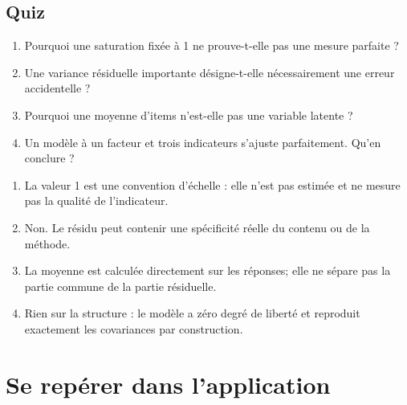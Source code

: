 \documentclass[
  french,
  11pt,
  a4paper,
  DIV=11,
  numbers=noendperiod]{scrreprt}
\providecommand{\tightlist}{%
  \setlength{\itemsep}{0pt}\setlength{\parskip}{0pt}}
\begin{document}
\section{Quiz}\label{quiz}

\begin{enumerate}
\def\labelenumi{\arabic{enumi}.}
\tightlist
\item
  Pourquoi une saturation fixée à 1 ne prouve-t-elle pas une mesure
  parfaite ?
\item
  Une variance résiduelle importante désigne-t-elle nécessairement une
  erreur accidentelle ?
\item
  Pourquoi une moyenne d'items n'est-elle pas une variable latente ?
\item
  Un modèle à un facteur et trois indicateurs s'ajuste parfaitement.
  Qu'en conclure ?
\end{enumerate}

\begin{tcolorbox}[enhanced jigsaw, arc=.35mm, bottomrule=.15mm, bottomtitle=1mm, breakable, colback=white, colbacktitle=quarto-callout-tip-color!10!white, colframe=quarto-callout-tip-color-frame, coltitle=black, left=2mm, leftrule=.75mm, opacityback=0, opacitybacktitle=0.6, rightrule=.15mm, title={Réponses}, titlerule=0mm, toprule=.15mm, toptitle=1mm]

\begin{enumerate}
\def\labelenumi{\arabic{enumi}.}
\tightlist
\item
  La valeur 1 est une convention d'échelle : elle n'est pas estimée et
  ne mesure pas la qualité de l'indicateur.
\item
  Non. Le résidu peut contenir une spécificité réelle du contenu ou de
  la méthode.
\item
  La moyenne est calculée directement sur les réponses; elle ne sépare
  pas la partie commune de la partie résiduelle.
\item
  Rien sur la structure : le modèle a zéro degré de liberté et reproduit
  exactement les covariances par construction.
\end{enumerate}

\end{tcolorbox}


\chapter{Se repérer dans l'application}\label{sec-interface}
\end{document}

